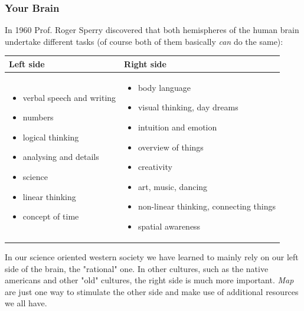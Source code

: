 \documentclass[12pt,a4paper]{article}
\begin{document}
\subsubsection*{Your Brain}
In 1960 Prof. {\sc Roger Sperry} discovered that both hemispheres
of the human brain undertake different tasks (of course both of them
basically {\em can} do the same): 
\begin{center}
\begin{tabular}{|p{5.5cm}|p{5.5cm}|} \hline
	Left side & Right side \\ \hline
	\begin{itemize}
	   \item verbal speech and writing 
	   \item numbers
	   \item logical thinking
	   \item analysing and details
	   \item science
	   \item linear thinking
	   \item concept of time
	\end{itemize} &
	\begin{itemize}
		\item body language
		\item visual thinking, day dreams
		\item intuition and emotion
		\item overview of things
		\item creativity
		\item art, music, dancing
		\item non-linear thinking, connecting things
		\item spatial awareness
	\end{itemize}     \\ \hline
\end{tabular}	
\end{center}
In our science oriented western society we have learned to mainly rely on our
left side of the brain, the "rational" one. In other cultures, such as the native americans and other "old" cultures, the right
side is much more important. {\em Map} are just one way to stimulate the
other side and make use of additional resources we all have.
\end{document}
